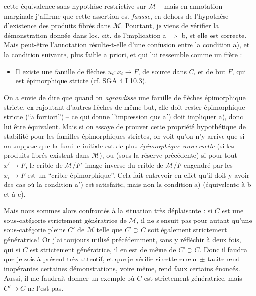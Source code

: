 cette équivalence sans hypothèse restrictive sur $\mathcal{M}$ – mais en annotation marginale j'affirme que cette assertion est \textit{fausse}, en dehors de l'hypothèse d'existence des produits fibrés dans $\mathcal{M}$. Pourtant, je viens de vérifier la démonstration donnée dans loc. cit. de l'implication a $\Longrightarrow$ b, et elle est correcte. Mais peut-être l'annotation résulte-t-elle d'une confusion entre la condition a), et la condition suivante, plus faible a priori, et qui lui ressemble comme un frère :
\begin{itemize}[label={}]
\item[a$'$)] Il existe une famille de flèches $u_i : x_i \longrightarrow F$, de source dans $C$, et de but $F$, qui est épimorphique stricte (cf. SGA 4 I 10.3).
\end{itemize}
On a envie de dire que quand on \textit{agrandisse} une famille de flèches épimorphique stricte, en rajoutant d'autres flèches de même but, elle doit rester épimorphique stricte (“a fortiori”) – ce qui donne l'impression que a$'$) doit impliquer a), donc lui être équivalent. Mais si on essaye de prouver cette propriété hypothétique %
de stabilité pour les familles épimorphiques strictes, on voit qu'on n'y arrive que si on suppose que la famille initiale est de plus \textit{épimorphique universelle} (si les produits fibrés existent dans $\mathcal{M}$), ou (sous la réserve précédente) si pour tout $x' \longrightarrow F$, le crible de $\mathcal{M}/F'$ image inverse du crible de $\mathcal{M}/F$ engendré par les $x_i \longrightarrow F$ est un “crible épimorphique”. Cela fait entrevoir en effet qu'il doit y avoir des cas où la condition a$'$) est satisfaite, mais non la condition a) (équivalente à b et à c).

Mais nous sommes alors confrontés à la situation très déplaisante : si $C$ est une sous-catégorie strictement génératrice de $\mathcal{M}$, il ne s'ensuit pas pour autant qu'une sous-catégorie pleine $C'$ de $\mathcal{M}$ telle que $C' \supset C$ soit également strictement génératrice\,! Or j'ai toujours utilisé précédemment, sans y réfléchir à deux fois, qui si $C$ est strictement génératrice, il en est de même de $C' \supset C$. Donc il faudra que je sois à présent très attentif, %
et que je vérifie si cette erreur $\pm$ tacite rend inopérantes certaines démonstrations, voire même, rend faux certains énoncés. Aussi, il me faudrait donner un exemple où $C$ est strictement génératrice, mais $C' \supset C$ ne l'est pas.

